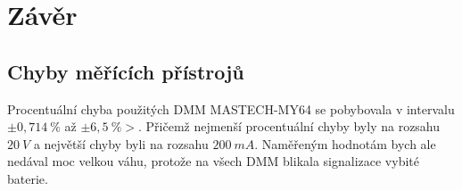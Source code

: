 \section{Závěr}
  
  
  \subsection{Chyby měřících přístrojů}
    \indent\indent
    Procentuální chyba použitých DMM MASTECH-MY64 se pobybovala v intervalu $\pm0,714~\%$ až $\pm 6,5~\%>$. Přičemž nejmenší procentuální chyby byly na rozsahu $20~V$ a největší chyby byli na rozsahu $200~mA$. Naměřeným hodnotám bych ale nedával moc velkou váhu, protože na všech DMM blikala signalizace vybité baterie.
  
